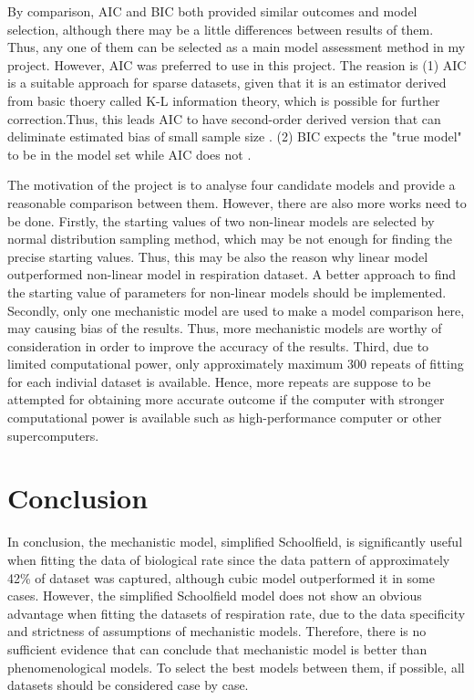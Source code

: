   By comparison, AIC and BIC both provided similar outcomes and model selection, although there may be a little differences between results of them. Thus, any one of them can be selected as a main model assessment method in my project. However, AIC was preferred to use in this project. The reasion is (1) AIC is a suitable approach for sparse datasets, given that it is an estimator derived from basic thoery called K-L information theory, which is possible for further correction.Thus, this leads AIC to have second-order derived version that can deliminate estimated bias of small sample size \cite{burnham_anderson_2004}. (2) BIC expects the "true model" to be in the model set while AIC does not \cite{johnson_2004}.

  The motivation of the project is to analyse four candidate models and provide a reasonable comparison between them. However, there are also more works need to be done. Firstly, the starting values of two non-linear models are selected by normal distribution sampling method, which may be not enough for finding the precise starting values. Thus, this may be also the reason why linear model outperformed non-linear model in respiration dataset. A better approach to find the starting value of parameters for non-linear models should be implemented. Secondly, only one mechanistic model are used to make a model comparison here, may causing bias of the results. Thus, more mechanistic models are worthy of consideration in order to improve the accuracy of the results. Third, due to limited computational power, only approximately maximum 300 repeats of fitting for each indivial dataset is available. Hence, more repeats are suppose to be attempted for obtaining more accurate outcome if the computer with stronger computational power is available such as high-performance computer or other supercomputers.

\section{Conclusion}

In conclusion, the mechanistic model, simplified Schoolfield, is significantly useful when fitting the data of biological rate since the data pattern of approximately 42\% of dataset was captured, although cubic model outperformed it in some cases. However, the simplified Schoolfield model does not show an obvious advantage when fitting the datasets of respiration rate, due to the data specificity and strictness of assumptions of mechanistic models. Therefore, there is no sufficient evidence that can conclude that mechanistic model is better than phenomenological models. To select the best models between them, if possible, all datasets should be considered case by case.
